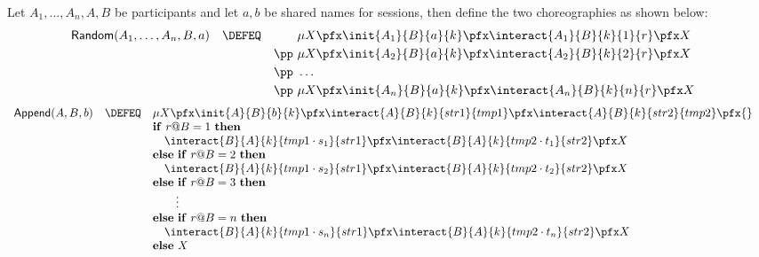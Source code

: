 \begin{definition}\label{logic4chor:def:PCPencoding}

  Let $A_1,\dots,A_n,A,B$ be participants and let $a,b$ be shared names for
  sessions, then define the two choreographies as shown below:
  \begin{align*}
    &
    \begin{array}{rcl}
      \textsf{Random}(A_1,\dots,A_n,B,a) &
      \DEFEQ &
      \phantom{{}\pp\ {}}\mu X \pfx
      \init{A_1}{B}{a}{k} \pfx
      \interact{A_1}{B}{k}{1}{r} \pfx X\\[1mm]
      &&
      \pp\ \mu X \pfx
      \init{A_2}{B}{a}{k} \pfx
      \interact{A_2}{B}{k}{2}{r} \pfx X\\[1mm]
      &&
      \pp\ \ldots\\[1mm]
      &&
      \pp\ \mu X \pfx
      \init{A_n}{B}{a}{k} \pfx
      \interact{A_n}{B}{k}{n}{r} \pfx X
      \end{array}
\end{align*}
\begin{align*}
    &
    \begin{array}{rcl}
      \textsf{Append}(A,B,b) &
      \DEFEQ &
      \mu X\pfx
      \init{A}{B}{b}{k} \pfx
      \interact{A}{B}{k}{str1}{tmp1} \pfx
      \interact{A}{B}{k}{str2}{tmp2} \pfx {} \\
      &
      &
      \mathbf{if}\ r@B = 1\ \mathbf{then} \\
      &
      &
      \quad
      \interact{B}{A}{k}{tmp1 \cdot s_1}{str1} \pfx
      \interact{B}{A}{k}{tmp2 \cdot t_1}{str2} \pfx X \\
      &
      &
      \mathbf{else}\ \mathbf{if}\ r@B = 2\ \mathbf{then} \\
      &
      &
      \quad
      \interact{B}{A}{k}{tmp1 \cdot s_2}{str1} \pfx
      \interact{B}{A}{k}{tmp2 \cdot t_2}{str2} \pfx X \\
      &
      &
      \mathbf{else} \ \mathbf{if}\ r@B = 3\ \mathbf{then} \\
      &
      &
      \qquad \vdots \\
      &
      &
      \mathbf{else} \ \mathbf{if}\ r@B = n\ \mathbf{then} \\
      &
      &
      \quad
      \interact{B}{A}{k}{tmp1 \cdot s_n}{str1} \pfx
      \interact{B}{A}{k}{tmp2 \cdot t_n}{str2} \pfx X \\
      &
      &
      \mathbf{else }\ X
    \end{array}
  \end{align*}

\end{definition}
